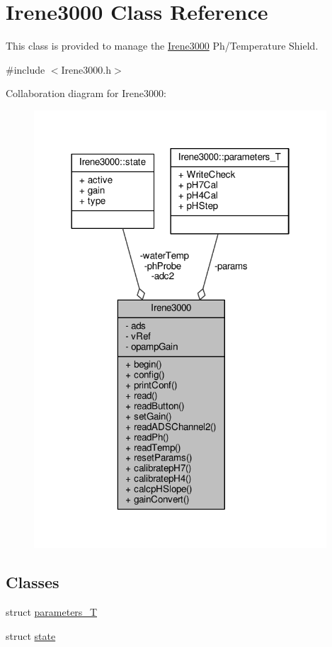 \hypertarget{classIrene3000}{}\section{Irene3000 Class Reference}
\label{classIrene3000}


This class is provided to manage the \hyperlink{classIrene3000}{Irene3000} Ph/\+Temperature Shield.  




{\ttfamily \#include $<$Irene3000.\+h$>$}



Collaboration diagram for Irene3000\+:\nopagebreak
\begin{figure}[H]
\begin{center}
\leavevmode
\includegraphics[width=310pt]{classIrene3000__coll__graph}
\end{center}
\end{figure}
\subsection*{Classes}
\begin{DoxyCompactItemize}
\item 
struct \hyperlink{structIrene3000_1_1parameters__T}{parameters\+\_\+T}
\item 
struct \hyperlink{structIrene3000_1_1state}{state}
\end{DoxyCompactItemize}
